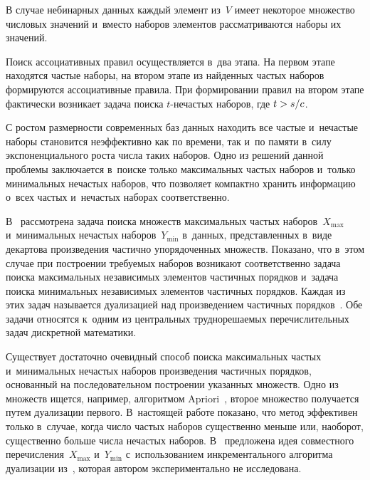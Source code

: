 \begin{multicols}{2}
    В случае небинарных данных каждый элемент из~$V$ имеет некоторое множество чис\-ло\-вых значений 
    и~вместо наборов элементов рас\-смат\-ри\-ва\-ют\-ся наборы их значений.

    Поиск ассоциативных правил осуществляется в~два этапа. 
    На первом этапе находятся частые наборы, на втором этапе из найденных час\-тых 
    наборов формируются ассоциативные правила. При формировании правил на втором 
    этапе фактически возникает задача поиска $t$-не\-час\-тых наборов, где $t\hm > s/c$.
    
    С ростом размерности современных баз данных находить все час\-тые и~не\-час\-тые 
    наборы становится неэффективно как по времени, так и~по памяти в~силу 
    экспоненциального рос\-та чис\-ла таких наборов. Одно из решений данной проблемы 
    заключается в~поиске только максимальных час\-тых наборов и~только минимальных 
    нечастых наборов, что позволяет компактно хранить информацию о~всех час\-тых и~не\-час\-тых 
    наборах соответственно. 
    
    
    В~\cite{9} рас\-смот\-ре\-на задача поиска множеств максимальных час\-тых наборов~$X_{\max}$ 
    и~минимальных не\-час\-тых наборов~$Y_{\min}$ в~данных, пред\-став\-лен\-ных в~виде декартова 
    произведения час\-тич\-но упорядоченных множеств. Показано, что в~этом случае 
    при построении тре\-бу\-емых наборов возникают соответственно задача поиска 
    максимальных независимых элементов час\-тич\-ных порядков и~задача поиска минимальных 
    независимых элементов час\-тич\-ных порядков.  Каж\-дая из этих задач называется 
    дуализацией над произведением час\-тич\-ных порядков~\cite{8}. Обе задачи относятся к~одним 
    из цент\-раль\-ных труд\-но\-ре\-ша\-емых пе\-ре\-чис\-ли\-тель\-ных задач дис\-крет\-ной математики.
    
    Существует достаточно очевидный способ поиска максимальных час\-тых и~минимальных
     не\-час\-тых наборов произведения час\-тич\-ных порядков, основанный на по\-сле\-до\-ва\-тель\-ном 
     по\-стро\-ении указанных множеств. Одно из множеств ищется, например, алгоритмом Apriori~\cite{2},
      второе множество получается путем дуализации первого. 
      В~настоящей работе показано, что метод эффективен только в~случае, когда чис\-ло час\-тых 
      наборов существенно меньше или, наоборот, существенно больше чис\-ла не\-час\-тых наборов. 
      В~\cite{9} предложена идея со\-вмест\-но\-го пе\-ре\-чис\-ле\-ния~$X_{\max}$ и~$Y_{\min}$ с~использованием
       инкрементального алгоритма дуализации из~\cite{14}, которая автором экспериментально 
       не исследована.
    

\end{multicols}
